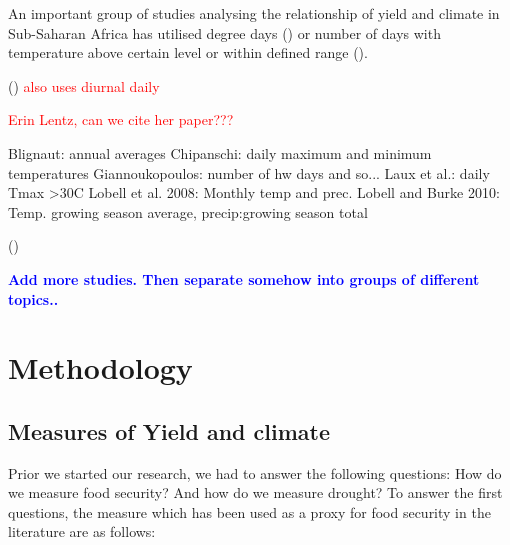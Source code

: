 \documentclass[a4paper,12pt]{article}
\begin{document}
An important group of studies analysing the relationship of yield and climate in Sub-Saharan Africa has utilised degree days (\citealt{SchulzeEtA1993,TingemEtAl2008,WalkerSchulze2008,TingemEtAl2009}) or number of days with temperature above certain level or within defined range (\citealt{Giannakopoulos2009,LauxEtAl}).

(\citealt{ThorntonEtAl2009}) \textcolor{red}{also uses diurnal daily}

\textcolor{red}{Erin Lentz, can we cite her paper???}


Blignaut: annual averages
Chipanschi: daily maximum and minimum temperatures
Giannoukopoulos: number of hw days and so...
Laux et al.: daily Tmax >30C
Lobell et al. 2008: Monthly temp and prec.
Lobell and Burke 2010: Temp. growing season average, precip:growing season total

(\citealt{AbrahaSavage2006,Adejuwon2004,BenMohamed2002,BLIGNAUT2009,
Chipanshi2003,Giannakopoulos2009,LauxEtAl,Leemans1993,LobellEtAl2008,
LobellBurke2010,sagoe2006,SchulzeEtA1993,ThorntonEtAl2009,TingemEtAl2008,
TingemEtAl2009,WalkerSchulze2008})

\textcolor{blue}{\textbf{Add more studies. Then separate somehow into groups of different topics..}}


\section{Methodology}\label{Method}

\subsection{Measures of Yield and climate}

 
Prior we started  our research, we had to answer the following questions: How do we measure food security? And how do we measure drought? To answer the first questions, the measure which has been used as a proxy for food security in the literature are as follows:
 
\vspace{2cm}
\end{document}
